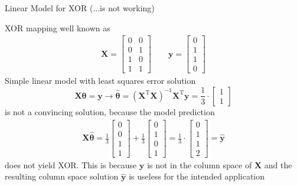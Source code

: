 \documentclass[mathserif, aspectratio=1610]{intbeamer}
\begin{document}
\begin{frame}[t]{Linear Model for XOR (...is not working)}

XOR mapping well known as
\begin{align*}
\bm{X} =
\begin{bmatrix}
0 & 0\\
0 & 1\\
1 & 0\\
1 & 1
\end{bmatrix}\qquad
\bm{y} =
\begin{bmatrix}
0\\
1\\
1\\
0
\end{bmatrix}
\end{align*}
Simple linear model with least squares error solution
$$\bm{X} \bm{\theta} = \bm{y} \rightarrow \hat{\bm{\theta}} = (\bm{X}^\mathrm{T} \bm{X})^{-1} \bm{X}^\mathrm{T} \bm{y}
=
\frac{1}{3}\cdot
\begin{bmatrix}
1\\
1
\end{bmatrix}
$$
is not a convincing solution, because the model prediction
\begin{align*}
\bm{X} \hat{\bm{\theta}} =
\frac{1}{3}
\begin{bmatrix}
0\\
0\\
1\\
1
\end{bmatrix}
+
\frac{1}{3}
\begin{bmatrix}
0\\
1\\
0\\
1
\end{bmatrix}
=
\frac{1}{3}\cdot
\begin{bmatrix}
0\\
1\\
1\\
2
\end{bmatrix}
=\hat{\bm{y}}
\end{align*}
does not yield XOR. This is because $\bm{y}$ is not in the column space of $\bm{X}$ and
the resulting column space solution $\hat{\bm{y}}$
is useless for the intended application

\end{frame}
\end{document}
